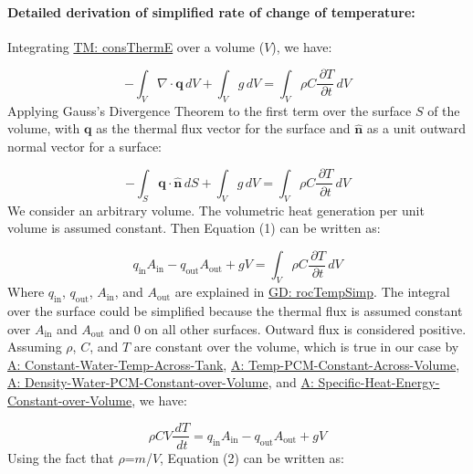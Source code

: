 \documentclass[12pt]{article}
\begin{document}
\paragraph{Detailed derivation of simplified rate of change of temperature:}
\label{GD:rocTempSimpDeriv}
Integrating \hyperref[TM:consThermE]{TM: consThermE} over a volume ($V$), we have:

\begin{displaymath}
-\int_{V}{∇\cdot{}\mathbf{q}}\,dV+\int_{V}{g}\,dV=\int_{V}{ρ C \frac{\,\partial{}T}{\,\partial{}t}}\,dV
\end{displaymath}
Applying Gauss's Divergence Theorem to the first term over the surface $S$ of the volume, with $\mathbf{q}$ as the thermal flux vector for the surface and $\mathbf{\hat{n}}$ as a unit outward normal vector for a surface:

\begin{displaymath}
-\int_{S}{\mathbf{q}\cdot{}\mathbf{\hat{n}}}\,dS+\int_{V}{g}\,dV=\int_{V}{ρ C \frac{\,\partial{}T}{\,\partial{}t}}\,dV
\end{displaymath}
We consider an arbitrary volume. The volumetric heat generation per unit volume is assumed constant. Then Equation (1) can be written as:

\begin{displaymath}
{q_{\text{in}}} {A_{\text{in}}}-{q_{\text{out}}} {A_{\text{out}}}+g V=\int_{V}{ρ C \frac{\,\partial{}T}{\,\partial{}t}}\,dV
\end{displaymath}
Where ${q_{\text{in}}}$, ${q_{\text{out}}}$, ${A_{\text{in}}}$, and ${A_{\text{out}}}$ are explained in \hyperref[GD:rocTempSimp]{GD: rocTempSimp}. The integral over the surface could be simplified because the thermal flux is assumed constant over ${A_{\text{in}}}$ and ${A_{\text{out}}}$ and $0$ on all other surfaces. Outward flux is considered positive. Assuming $ρ$, $C$, and $T$ are constant over the volume, which is true in our case by \hyperref[assumpCWTAT]{A: Constant-Water-Temp-Across-Tank}, \hyperref[assumpTPCAV]{A: Temp-PCM-Constant-Across-Volume}, \hyperref[assumpDWPCoV]{A: Density-Water-PCM-Constant-over-Volume}, and \hyperref[assumpSHECov]{A: Specific-Heat-Energy-Constant-over-Volume}, we have:

\begin{displaymath}
ρ C V \frac{\,dT}{\,dt}={q_{\text{in}}} {A_{\text{in}}}-{q_{\text{out}}} {A_{\text{out}}}+g V
\end{displaymath}
Using the fact that $ρ$=$m$/$V$, Equation (2) can be written as:
\end{document}

